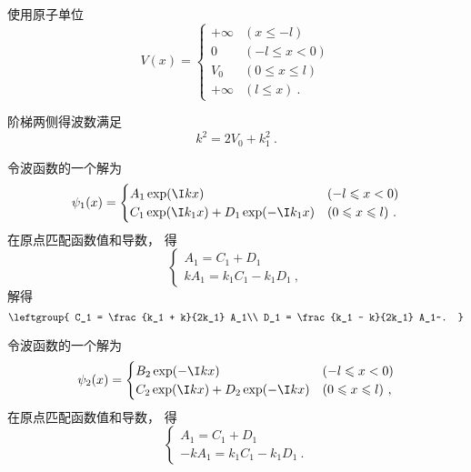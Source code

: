 
\begin{issues}
\issueDraft
\end{issues}


使用原子单位
\begin{equation}
V(x) =
\begin{cases}
+\infty  & (x \leqslant -l)\\
0  & (-l \leqslant x < 0)\\
V_0  & (0 \leqslant x \leqslant l)\\
+\infty  & (l \leqslant x)~.
\end{cases}
\end{equation}

阶梯两侧得波数满足
\begin{equation}
k^2 = 2V_0 + k_1^2~.
\end{equation}

令波函数的一个解为
\begin{equation}
\psi_1(x) =
\begin{cases}
A_1 \exp(\I k x)  & (-l \leqslant x < 0)\\
C_1 \exp(\I k_1 x) + D_1 \exp(-\I k_1 x) & (0 \leqslant x \leqslant l)~.
\end{cases}
\end{equation}
在原点匹配函数值和导数， 得
\begin{equation}
\begin{cases}
A_1 = C_1 + D_1\\
kA_1 = k_1 C_1 - k_1 D_1~,
\end{cases}
\end{equation}
解得
\begin{equation}
\leftgroup{
    C_1 = \frac{k_1 + k}{2k_1} A_1\\
    D_1 = \frac{k_1 - k}{2k_1} A_1~.
}
\end{equation}

令波函数的一个解为
\begin{equation}
\psi_2(x) =
\begin{cases}
B_2 \exp(-\I k x)  & (-l \leqslant x < 0)\\
C_2 \exp(\I k x) + D_2 \exp(-\I k x) & (0 \leqslant x \leqslant l)~,
\end{cases}
\end{equation}
在原点匹配函数值和导数， 得
\begin{equation}
\begin{cases}
A_1 = C_1 + D_1\\
-kA_1 = k_1 C_1 - k_1 D_1~.
\end{cases}
\end{equation}
